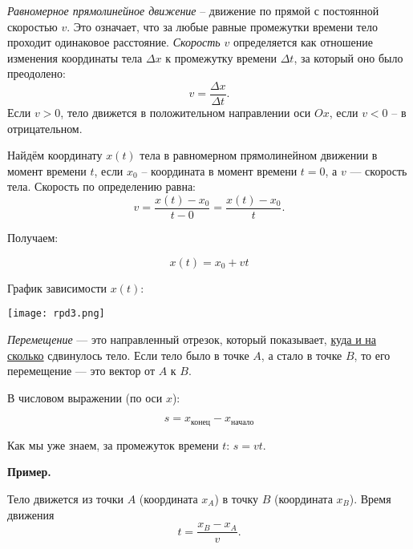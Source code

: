 \documentclass[12 pt, a4paper]{article}%
\begin{document}
\textit{Равномерное прямолинейное движение} – движение по прямой с постоянной скоростью \(v\). Это означает, что за любые равные промежутки времени тело проходит одинаковое расстояние.
\textit{Скорость} \(v\) определяется как отношение изменения координаты тела \(\Delta x\) к промежутку времени \(\Delta t\), за который оно было преодолено:  
\[v = \dfrac{\Delta x}{\Delta t}.\]  
Если \(v>0\), тело движется в положительном направлении оси \(Ox\), если \(v<0\) – в отрицательном.

Найдём координату $x(t)$ тела в равномерном прямолинейном движении в момент времени $t$, если \(x_0\) – координата в момент времени \(t=0\), а $v$ --- скорость тела.
Скорость по определению равна:
\[v = \frac{x(t)-x_0}{t-0} = \frac{x(t)-x_0}{t}.\]

Получаем:

\[x(t) = x_0 + vt\]

График зависимости $x(t)$:

\begin{center}
\texttt{[image: rpd3.png]}
\label{fig:mpr}
\end{center}

\textit{Перемещение} — это направленный отрезок, который показывает, \underline{куда и на сколько} сдвинулось тело.  
Если тело было в точке \(A\), а стало в точке \(B\), то его перемещение — это вектор от \(A\) к \(B\).

В числовом выражении (по оси \(x\)):

\[
s = x_{\text{конец}} - x_{\text{начало}}
\]


Как мы уже знаем, за промежуток времени \(t\): \(s = vt\).

\textbf{Пример.} 

Тело движется из точки \(A\) (координата \(x_A\)) в точку \(B\) (координата \(x_B\)).  
   Время движения  
   \[
     t = \frac{x_B - x_A}{v}.
   \]
\end{document}

